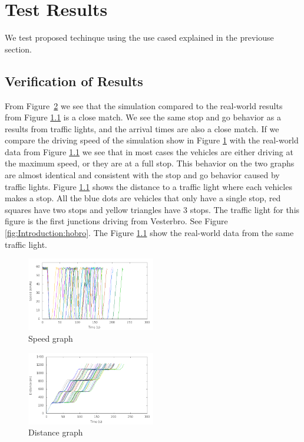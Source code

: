 \section{Test Results}
We test proposed techinque using the use cased explained in the previouse section.

\subsection{Verification of Results}

From Figure~\ref{fig:TestResults:distance0} we see that the simulation compared to the real-world results from Figure \ref{} is a close match. 
We see the same stop and go behavior as a results from traffic lights, and the arrival times are also a close match. 
If we compare the driving speed of the simulation show in Figure \ref{fig:TestResults:speed0} with the real-world data from Figure \ref{} we see that in most cases the vehicles are either driving at the maximum speed, or they are at a full stop. 
This behavior on the two graphs are almost identical and consistent with the stop and go behavior caused by traffic lights. 
Figure \ref{} shows the distance to a traffic light where each vehicles makes a stop. 
All the blue dots are vehicles that only have a single stop, red squares have two stops and yellow triangles have 3 stops.
The traffic light for this figure is the first junctions driving from Vesterbro. See Figure \ref{fig:Introduction:hobro}. The Figure \ref{} show the real-world data from the same traffic light. 

\begin{figure}[htb]
\includegraphics[width=0.5\textwidth]{images/tp0/speed0.png}
\caption{Speed graph}
\label{fig:TestResults:speed0}
\end{figure}

\begin{figure}[htb]
\includegraphics[width=0.5\textwidth]{images/tp0/distance0.png}
\caption{Distance graph}
\label{fig:TestResults:distance0}
\end{figure}

